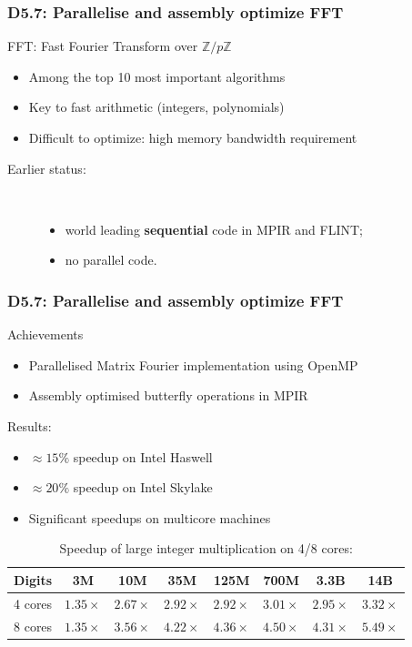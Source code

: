 \documentclass{beamer}
\begin{document}
\begin{frame}
  \frametitle{D5.7: Parallelise and assembly optimize FFT}

  \begin{block}    {FFT: Fast Fourier Transform over $\mathbb{Z}/p\mathbb{Z}$}
    \begin{itemize}
    \item Among the top 10 most important algorithms
    \item Key to fast arithmetic (integers, polynomials)
    \item Difficult to optimize: high memory bandwidth requirement
    \end{itemize}
    \begin{description}
    \item[Earlier status:]\
      \begin{itemize}
      \item world leading \textbf{sequential} code in MPIR and FLINT;
      \item no parallel code.
        \end{itemize}
    \end{description}
  \end{block}
\end{frame}
\begin{frame}
  \frametitle{D5.7: Parallelise and assembly optimize FFT}
  \begin{block} {Achievements}
  \begin{itemize}
\item Parallelised Matrix Fourier implementation using OpenMP
\item Assembly optimised butterfly operations in MPIR
\end{itemize}
  \end{block}

\begin{block}{Results:}

\begin{itemize}
\item $\approx 15\%$ speedup  on Intel Haswell
\item $\approx 20\%$ speedup on Intel Skylake
\item Significant speedups on multicore machines
\end{itemize}
\end{block}

\vspace{-1em}
\begin{table}
  \caption{Speedup of large integer multiplication on 4/8 cores:}
  \begin{tabular}{cccccccc}
  \toprule
{Digits} & 3M & 10M & 35M & 125M & 700M & 3.3B & 14B\\
\midrule
    {4 cores} & $1.35\times$ & $2.67\times$ & $2.92\times$ & $2.92\times$ & $3.01\times$ & $2.95\times$ & $3.32\times$ \\
{8 cores} & $1.35\times$ & $3.56\times$ & $4.22\times$ & $4.36\times$ & $4.50\times$ & $4.31\times$ & $5.49\times$\\
\bottomrule
\end{tabular}
\end{table}
\end{frame}
\end{document}
